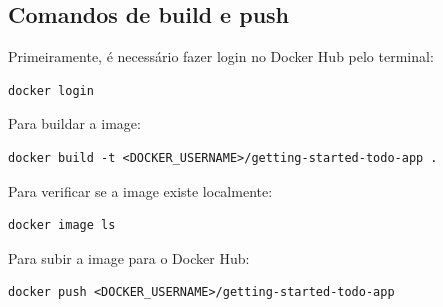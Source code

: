 \subsection{Comandos de build e push}

Primeiramente, é necessário fazer login no Docker Hub pelo terminal:

\begin{verbatim}
docker login
\end{verbatim}

Para buildar a image:

\begin{verbatim}
docker build -t <DOCKER_USERNAME>/getting-started-todo-app .
\end{verbatim}

Para verificar se a image existe localmente:

\begin{verbatim}
docker image ls
\end{verbatim}

Para subir a image para o Docker Hub:

\begin{verbatim}
docker push <DOCKER_USERNAME>/getting-started-todo-app
\end{verbatim}
